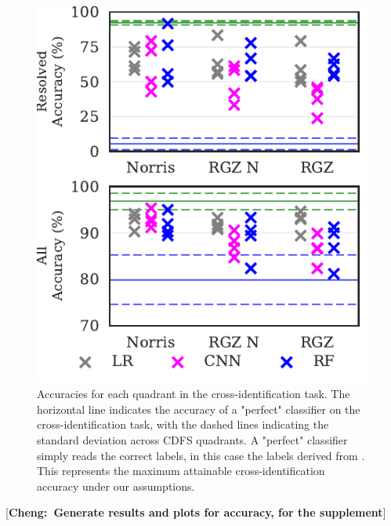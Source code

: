 \documentclass[fleqn,usenatbib,usedcolumn]{mnras}
\newcommand{\cheng}[1]{ {\color{teal}[{\bf Cheng:~{#1}}]} }
\begin{document}
  \begin{figure}
  \centering
  \includegraphics[width=\columnwidth]{images/cdfs_cross_identification_grid.pdf}
  \caption{Accuracies for each quadrant in the cross-identification
    task. The horizontal line indicates the accuracy of a "perfect" classifier
    on the cross-identification task, with the dashed lines indicating the
    standard deviation across CDFS quadrants. A "perfect" classifier simply
    reads the correct labels, in this case the labels derived from
    \citet{norris06}. This represents the maximum attainable cross-identification
    accuracy under our assumptions.
    \label{fig:cross-id-accuracy}}
  \end{figure}

  \cheng{Generate results and plots for accuracy, for the supplement}
\end{document}
